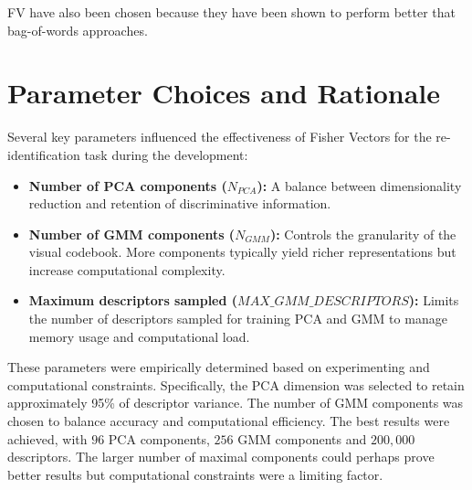 FV have also been chosen because they have been shown to perform better that bag-of-words approaches.\cite{5540009}

\section{Parameter Choices and Rationale}
\label{sec:parameter_choices}

Several key parameters influenced the effectiveness of Fisher Vectors for the re-identification task during the development:

\begin{itemize}
    \item \textbf{Number of PCA components ($N_{PCA}$):} A balance between dimensionality reduction and retention of discriminative information.
    \item \textbf{Number of GMM components ($N_{GMM}$):} Controls the granularity of the visual codebook. More components typically yield richer representations but increase computational complexity.
    \item \textbf{Maximum descriptors sampled ($MAX\_GMM\_DESCRIPTORS$):} Limits the number of descriptors sampled for training PCA and GMM to manage memory usage and computational load.
\end{itemize}

These parameters were empirically determined based on experimenting and computational constraints. Specifically, the PCA dimension was selected to retain approximately 95\% of descriptor variance. The number of GMM components was chosen to balance accuracy and computational efficiency. The best results were achieved, with $96$ PCA components, $256$ GMM components and $200,000$ descriptors. The larger number of maximal components could perhaps prove better results but computational constraints were a limiting factor.